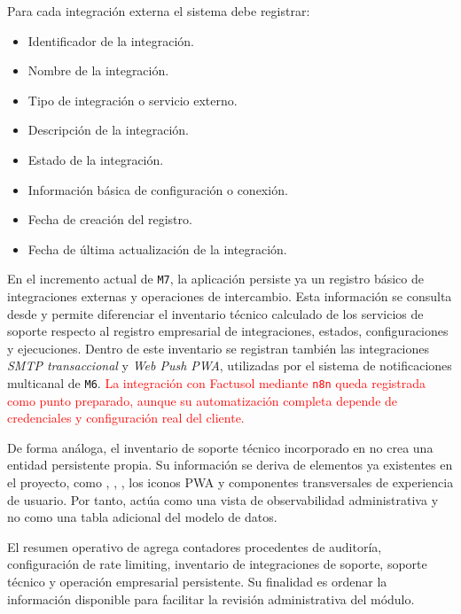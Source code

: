Para cada integración externa el sistema debe registrar:

\begin{itemize}
    \item Identificador de la integración.
    \item Nombre de la integración.
    \item Tipo de integración o servicio externo.
    \item Descripción de la integración.
    \item Estado de la integración.
    \item Información básica de configuración o conexión.
    \item Fecha de creación del registro.
    \item Fecha de última actualización de la integración.
\end{itemize}

En el incremento actual de \texttt{M7}, la aplicación persiste ya un registro básico de integraciones externas y operaciones de intercambio. Esta información se consulta desde  y permite diferenciar el inventario técnico calculado de los servicios de soporte respecto al registro empresarial de integraciones, estados, configuraciones y ejecuciones. Dentro de este inventario se registran también las integraciones \textit{SMTP transaccional} y \textit{Web Push PWA}, utilizadas por el sistema de notificaciones multicanal de \texttt{M6}. \textcolor{red}{La integración con Factusol mediante \texttt{n8n} queda registrada como punto preparado, aunque su automatización completa depende de credenciales y configuración real del cliente.}

De forma análoga, el inventario de soporte técnico incorporado en  no crea una entidad persistente propia. Su información se deriva de elementos ya existentes en el proyecto, como , , , los iconos PWA y componentes transversales de experiencia de usuario. Por tanto, actúa como una vista de observabilidad administrativa y no como una tabla adicional del modelo de datos.

El resumen operativo de  agrega contadores procedentes de auditoría, configuración de rate limiting, inventario de integraciones de soporte, soporte técnico y operación empresarial persistente. Su finalidad es ordenar la información disponible para facilitar la revisión administrativa del módulo.

